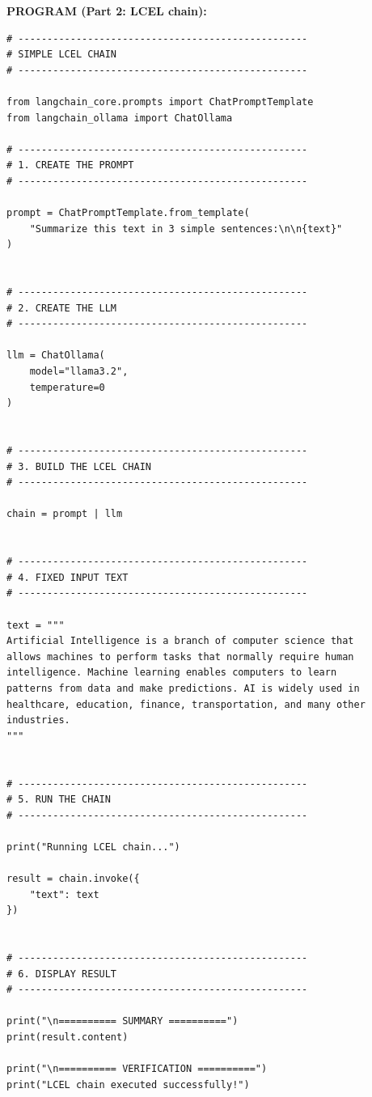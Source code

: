 \documentclass[10pt,a4paper]{article}
\newcommand{\sectionlabel}[1]{\par\vspace{3pt}\noindent\textbf{#1}\par\nopagebreak}
\begin{document}
\sectionlabel{PROGRAM (Part 2: LCEL chain):}
\begin{lstlisting}[style=code]
# --------------------------------------------------
# SIMPLE LCEL CHAIN
# --------------------------------------------------

from langchain_core.prompts import ChatPromptTemplate
from langchain_ollama import ChatOllama

# --------------------------------------------------
# 1. CREATE THE PROMPT
# --------------------------------------------------

prompt = ChatPromptTemplate.from_template(
    "Summarize this text in 3 simple sentences:\n\n{text}"
)


# --------------------------------------------------
# 2. CREATE THE LLM
# --------------------------------------------------

llm = ChatOllama(
    model="llama3.2",
    temperature=0
)


# --------------------------------------------------
# 3. BUILD THE LCEL CHAIN
# --------------------------------------------------

chain = prompt | llm


# --------------------------------------------------
# 4. FIXED INPUT TEXT
# --------------------------------------------------

text = """
Artificial Intelligence is a branch of computer science that
allows machines to perform tasks that normally require human
intelligence. Machine learning enables computers to learn
patterns from data and make predictions. AI is widely used in
healthcare, education, finance, transportation, and many other
industries.
"""


# --------------------------------------------------
# 5. RUN THE CHAIN
# --------------------------------------------------

print("Running LCEL chain...")

result = chain.invoke({
    "text": text
})


# --------------------------------------------------
# 6. DISPLAY RESULT
# --------------------------------------------------

print("\n========== SUMMARY ==========")
print(result.content)

print("\n========== VERIFICATION ==========")
print("LCEL chain executed successfully!")
\end{lstlisting}
\end{document}
